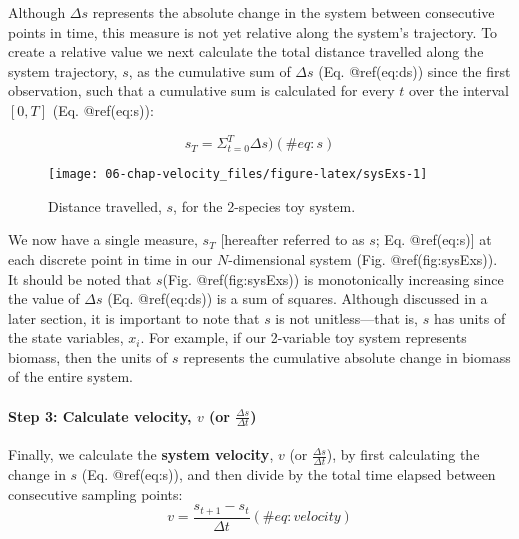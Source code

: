 \documentclass[]{article}
\let\oldparagraph\paragraph
\renewcommand{\paragraph}[1]{\oldparagraph{#1}\mbox{}}
\begin{document}
Although \(\Delta s\) represents the absolute change in the system
between consecutive points in time, this measure is not yet relative
along the system's trajectory. To create a relative value we next
calculate the total distance travelled along the system trajectory,
\(s\), as the cumulative sum of \(\Delta s\) (Eq. @ref(eq:ds)) since the
first observation, such that a cumulative sum is calculated for every
\(t\) over the interval \([0,T]\) (Eq. @ref(eq:s)):

\begin{equation}
s_T = \Sigma_{t=0}^{T}{\Delta s}) 
  (\#eq:s)
\end{equation}

\begin{figure}

{\centering \texttt{[image: 06-chap-velocity\_files/figure-latex/sysExs-1]} 

}

\caption{Distance travelled, $s$, for the 2-species toy system.}\label{fig:sysExs}
\end{figure}

We now have a single measure, \(s_T\) {[}hereafter referred to as \(s\);
Eq. @ref(eq:s){]} at each discrete point in time in our
\(N\)-dimensional system (Fig. @ref(fig:sysExs)). It should be noted
that \(s\)(Fig. @ref(fig:sysExs)) is monotonically increasing since the
value of \(\Delta s\) (Eq. @ref(eq:ds)) is a sum of squares. Although
discussed in a later section, it is important to note that \(s\) is not
unitless---that is, \(s\) has units of the state variables, \(x_i\). For
example, if our 2-variable toy system represents biomass, then the units
of \(s\) represents the cumulative absolute change in biomass of the
entire system.

\hypertarget{step-3-calculate-velocity-v-or-fracdelta-sdelta-t}{%
\paragraph{\texorpdfstring{Step 3: Calculate velocity, \(v\) (or
\(\frac{\Delta s}{\Delta t}\))}{Step 3: Calculate velocity, v (or \textbackslash{}frac\{\textbackslash{}Delta s\}\{\textbackslash{}Delta t\})}}\label{step-3-calculate-velocity-v-or-fracdelta-sdelta-t}}

Finally, we calculate the \textbf{system velocity}, \(v\) (or
\(\frac{\Delta s}{\Delta t}\)), by first calculating the change in \(s\)
(Eq. @ref(eq:s)), and then divide by the total time elapsed between
consecutive sampling points: \begin{equation}
 v = \frac {s_{t+1}-s_{t}}{\Delta t} 
(\#eq:velocity)
\end{equation}
\end{document}
